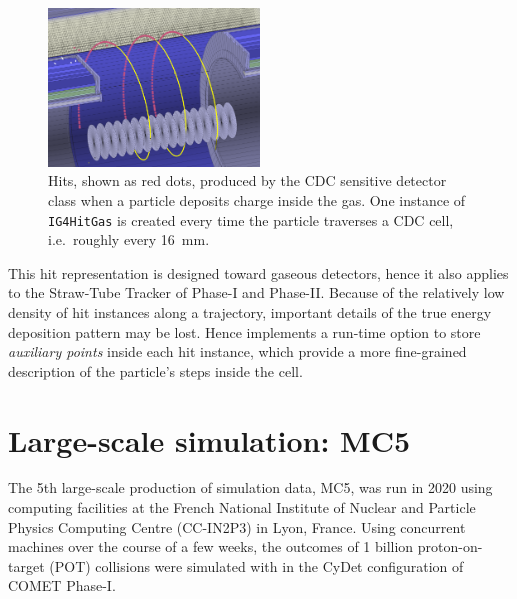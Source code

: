 \begin{figure}
    \centering
    \includegraphics[width=0.5\textwidth]{chapter3/hit_instances_blur_crop.png}
    \caption{
        Hits, shown as red dots, produced by the CDC sensitive detector class
        when a particle deposits charge inside the gas. One instance of
        \texttt{IG4HitGas} is created every time the particle traverses a CDC
        cell, i.e.\ roughly every \SI{16}{mm}.
        }
    \label{fig:sim_cdc_hits}
\end{figure}


This hit representation is designed toward gaseous detectors, hence it
also applies to the Straw-Tube Tracker of Phase-I and Phase-II. Because of the
relatively low density of hit instances along a trajectory, important details of
the true energy deposition pattern may be lost. Hence \SimG implements a
run-time option to store \emph{auxiliary points} inside each hit instance, which
provide a more fine-grained description of the particle's steps inside the cell.




\section{Large-scale simulation: MC5}
\label{sec:mc5}
The 5th large-scale production of simulation data, MC5, was run in 2020 using computing facilities at the French National Institute of Nuclear and Particle Physics Computing Centre (CC-IN2P3) in Lyon, France.
Using  concurrent machines over the course of a few weeks, the outcomes of 1 billion proton-on-target (POT) collisions were simulated with \SimG in the CyDet configuration of COMET Phase-I.

